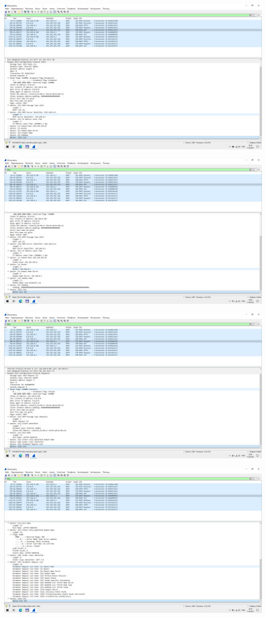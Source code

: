 \includegraphics[width=\textwidth]{screenshots/dhcp_ack1_1}

\includegraphics[width=\textwidth]{screenshots/dhcp_ack1_2}

\includegraphics[width=\textwidth]{screenshots/dhcp_request2_1}

\includegraphics[width=\textwidth]{screenshots/dhcp_request2_2}

